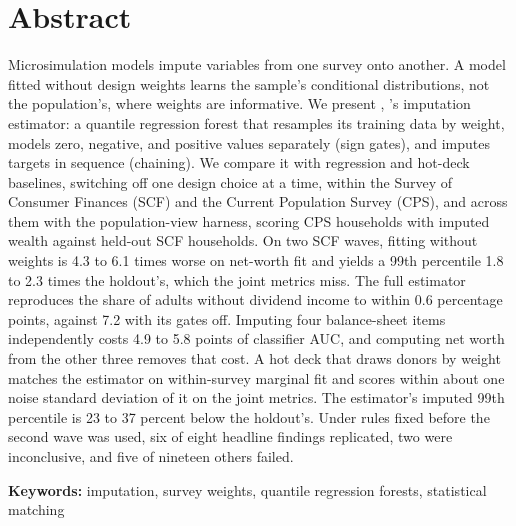 \section*{Abstract}

Microsimulation models impute variables from one survey onto another. A
model fitted without design weights learns the sample's conditional
distributions, not the population's, where weights are informative. We present \populacefit{}, \policyengine{}'s imputation
estimator: a quantile regression forest that resamples its training data by
weight, models zero, negative, and positive values separately (sign gates),
and imputes targets in sequence (chaining). We compare it with regression
and hot-deck baselines, switching off one design choice at a time, within
the Survey of Consumer Finances (SCF) and the Current Population Survey
(CPS), and across them with the population-view harness, scoring CPS
households with imputed wealth against held-out SCF households. On two SCF
waves, fitting without weights is 4.3 to 6.1 times worse on net-worth
fit and yields a 99th percentile 1.8 to 2.3 times the holdout's,
which the joint metrics miss. The full estimator reproduces the
share of adults without dividend income to within 0.6 percentage points,
against 7.2 with its gates off. Imputing four balance-sheet items
independently costs 4.9 to 5.8 points of classifier AUC, and
computing net worth from the other three removes that cost. A hot deck that
draws donors by weight matches the estimator on within-survey marginal fit
and scores within about one noise standard deviation of it on the joint metrics. The
estimator's imputed 99th percentile is 23 to 37 percent below the
holdout's. Under rules fixed before the second wave was used, six of eight
headline findings replicated, two were inconclusive, and five of nineteen
others failed.

\vspace{1em}
\noindent\textbf{Keywords:} imputation, survey weights, quantile regression
forests, statistical matching
